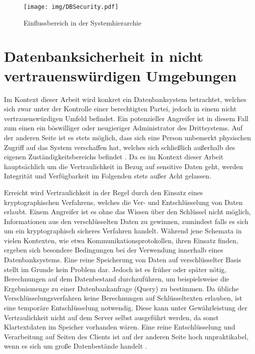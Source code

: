 \begin{figure}
	\texttt{[image: img/DBSecurity.pdf]}
	\centering
	\caption{Einflussbereich in der Systemhierarchie}
	\label{fig:dbsecurity}
\end{figure}

\section{Datenbanksicherheit in nicht vertrauenswürdigen Umgebungen}
Im Kontext dieser Arbeit wird konkret ein Datenbanksystem betrachtet, welches sich zwar unter der Kontrolle einer berechtigten Partei, jedoch in einem nicht vertrauenswürdigen Umfeld befindet. Ein potenzieller Angreifer ist in diesem Fall zum einen ein böswilliger oder neugieriger Administrator des Drittsystems. Auf der anderen Seite ist es stets möglich, dass sich eine Person unbemerkt physischen Zugriff auf das System verschaffen hat, welches sich schließlich außerhalb des eigenen Zuständigkeitsbereichs befindet \cite{Popa2012}. Da es im Kontext dieser Arbeit hauptsächlich um die Vertraulichkeit in Bezug auf sensitive Daten geht, werden Integrität und Verfügbarkeit im Folgenden stets außer Acht gelassen. 

Erreicht wird Vertraulichkeit in der Regel durch den Einsatz eines kryptographischen Verfahrens, welches die Ver- und Entschlüsselung von Daten erlaubt. Einem Angreifer ist es ohne das Wissen über den Schlüssel nicht möglich, Informationen aus den verschlüsselten Daten zu gewinnen, zumindest falls es sich um ein kryptographisch sicheres Verfahren handelt. Während jene Schemata in vielen Kontexten, wie etwa Kommunikationsprotokollen, ihren Einsatz finden, ergeben sich besondere Bedingungen bei der Verwendung innerhalb eines Datenbanksystems. Eine reine Speicherung von Daten auf verschlüsselter Basis stellt im Grunde kein Problem dar. Jedoch ist es früher oder später nötig, Berechnungen auf dem Datenbestand durchzuführen, um beispielsweise die Ergebnismenge zu einer Datenbankanfrage (Query) zu bestimmen. Da übliche Verschlüsselungsverfahren keine Berechnungen auf Schlüsseltexten erlauben, ist eine temporäre Entschlüsselung notwendig. Diese kann unter Gewährleistung der Vertraulichkeit nicht auf dem Server selbst ausgeführt werden, da sonst Klartextdaten im Speicher vorhanden wären. Eine reine Entschlüsselung und Verarbeitung auf Seiten des Clients ist auf der anderen Seite hoch unpraktikabel, wenn es sich um große Datenbestände handelt \cite{Popa2012}.

